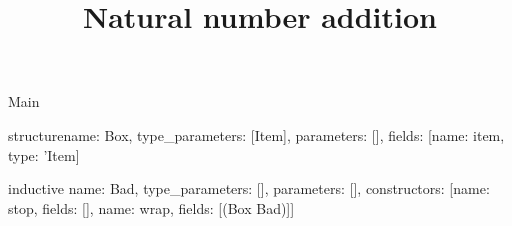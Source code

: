 \begin{lexlean}{Main}
\title{Natural number addition}
\begin{semanticmodule}
structure{name: Box, type_parameters: [Item], parameters: [], fields: [{name: item, type: 'Item}]}

inductive{
  name: Bad,
  type_parameters: [],
  parameters: [],
  constructors: [{name: stop, fields: []}, {name: wrap, fields: [(Box Bad)]}]
}
\end{semanticmodule}
\end{lexlean}
